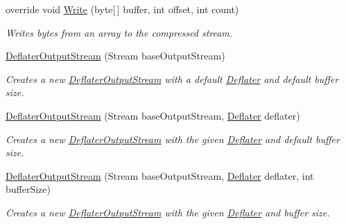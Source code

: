 \begin{DoxyCompactItemize}
override void \hyperlink{class_i_c_sharp_code_1_1_sharp_zip_lib_1_1_zip_1_1_compression_1_1_streams_1_1_deflater_output_stream_a7e12e55ebbeacb9b0021246ca76772fe}{Write} (byte\mbox{[}$\,$\mbox{]} buffer, int offset, int count)
\begin{DoxyCompactList}\small\item\em Writes bytes from an array to the compressed stream. \end{DoxyCompactList}\item 
\hyperlink{class_i_c_sharp_code_1_1_sharp_zip_lib_1_1_zip_1_1_compression_1_1_streams_1_1_deflater_output_stream_af11fca20044751df853e67264fb05ee5}{Deflater\+Output\+Stream} (Stream base\+Output\+Stream)
\begin{DoxyCompactList}\small\item\em Creates a new \hyperlink{class_i_c_sharp_code_1_1_sharp_zip_lib_1_1_zip_1_1_compression_1_1_streams_1_1_deflater_output_stream}{Deflater\+Output\+Stream} with a default \hyperlink{class_i_c_sharp_code_1_1_sharp_zip_lib_1_1_zip_1_1_compression_1_1_deflater}{Deflater} and default buffer size. \end{DoxyCompactList}\item 
\hyperlink{class_i_c_sharp_code_1_1_sharp_zip_lib_1_1_zip_1_1_compression_1_1_streams_1_1_deflater_output_stream_a2715b711ea6e8cb17a58898d0571f2f2}{Deflater\+Output\+Stream} (Stream base\+Output\+Stream, \hyperlink{class_i_c_sharp_code_1_1_sharp_zip_lib_1_1_zip_1_1_compression_1_1_deflater}{Deflater} deflater)
\begin{DoxyCompactList}\small\item\em Creates a new \hyperlink{class_i_c_sharp_code_1_1_sharp_zip_lib_1_1_zip_1_1_compression_1_1_streams_1_1_deflater_output_stream}{Deflater\+Output\+Stream} with the given \hyperlink{class_i_c_sharp_code_1_1_sharp_zip_lib_1_1_zip_1_1_compression_1_1_deflater}{Deflater} and default buffer size. \end{DoxyCompactList}\item 
\hyperlink{class_i_c_sharp_code_1_1_sharp_zip_lib_1_1_zip_1_1_compression_1_1_streams_1_1_deflater_output_stream_a8974b4f41beeceb684ab4c349c18b5a3}{Deflater\+Output\+Stream} (Stream base\+Output\+Stream, \hyperlink{class_i_c_sharp_code_1_1_sharp_zip_lib_1_1_zip_1_1_compression_1_1_deflater}{Deflater} deflater, int buffer\+Size)
\begin{DoxyCompactList}\small\item\em Creates a new \hyperlink{class_i_c_sharp_code_1_1_sharp_zip_lib_1_1_zip_1_1_compression_1_1_streams_1_1_deflater_output_stream}{Deflater\+Output\+Stream} with the given \hyperlink{class_i_c_sharp_code_1_1_sharp_zip_lib_1_1_zip_1_1_compression_1_1_deflater}{Deflater} and buffer size. \end{DoxyCompactList}\item 

\end{DoxyCompactItemize}
